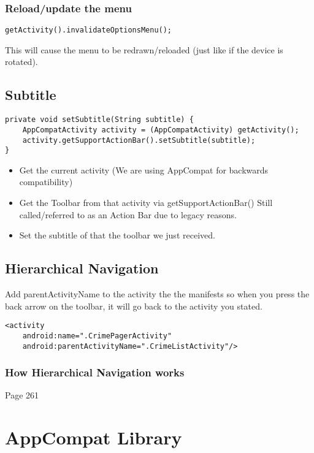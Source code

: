 \documentclass[]{article}
\begin{document}
\subsubsection{Reload/update the menu}
\begin{lstlisting}
getActivity().invalidateOptionsMenu();
\end{lstlisting}
This will cause the menu to be redrawn/reloaded (just like if the device is rotated).
\subsection{Subtitle}
\begin{lstlisting}
private void setSubtitle(String subtitle) {
	AppCompatActivity activity = (AppCompatActivity) getActivity();
	activity.getSupportActionBar().setSubtitle(subtitle);
}
\end{lstlisting}
\begin{itemize}
	\item Get the current activity
	\subitem (We are using AppCompat for backwards compatibility)
	
	\item Get the Toolbar from that activity via getSupportActionBar()
	\subitem Still called/referred to as an Action Bar due to legacy reasons.
	
	\item Set the subtitle of that the toolbar we just received.
\end{itemize}

\subsection{Hierarchical Navigation}
Add parentActivityName to the activity the the manifests so when you press the back arrow on the toolbar, it will go back to the activity you stated.
\begin{lstlisting}
<activity
	android:name=".CrimePagerActivity"
	android:parentActivityName=".CrimeListActivity"/>
\end{lstlisting}

\subsubsection{How Hierarchical Navigation works}
Page 261

\section{AppCompat Library}
\end{document}
